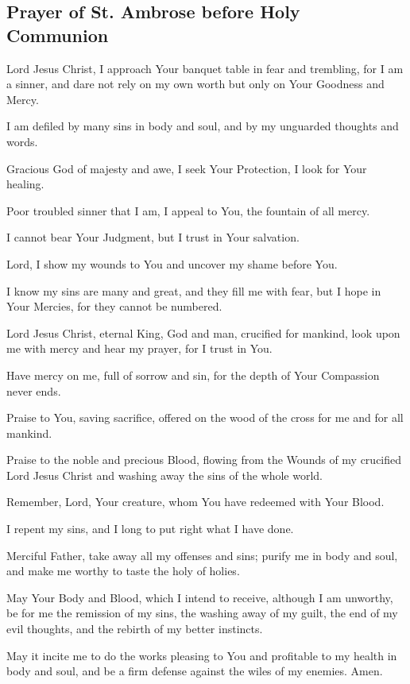 \documentclass[12pt]{article}
\newcommand{\prayertitle}[1]{\subsection{#1}}
\begin{document}
\prayertitle{Prayer of St. Ambrose before Holy Communion}
Lord Jesus Christ, I approach Your banquet table in fear and trembling, for I am a sinner, and dare not rely on my own worth but only on Your Goodness and Mercy.

I am defiled by many sins in body and soul, and by my unguarded thoughts and words.

Gracious God of majesty and awe, I seek Your Protection, I look for Your healing.

Poor troubled sinner that I am, I appeal to You, the fountain of all mercy.

I cannot bear Your Judgment, but I trust in Your salvation.

Lord, I show my wounds to You and uncover my shame before You.

I know my sins are many and great, and they fill me with fear, but I hope in Your Mercies, for they cannot be numbered.

Lord Jesus Christ, eternal King, God and man, crucified for mankind, look upon me with mercy and hear my prayer, for I trust in You.

Have mercy on me, full of sorrow and sin, for the depth of Your Compassion never ends.

Praise to You, saving sacrifice, offered on the wood of the cross for me and for all mankind.

Praise to the noble and precious Blood, flowing from the Wounds of my crucified Lord Jesus Christ and washing away the sins of the whole world.

Remember, Lord, Your creature, whom You have redeemed with Your Blood.

I repent my sins, and I long to put right what I have done.

Merciful Father, take away all my offenses and sins;
purify me in body and soul, and make me worthy to taste the holy of holies.

May Your Body and Blood, which I intend to receive, although I am unworthy, be for me the remission of my sins, the washing away of my guilt, the end of my evil thoughts, and the rebirth of my better instincts.

May it incite me to do the works pleasing to You and profitable to my health in body and soul, and be a firm defense against the wiles of my enemies.
Amen.
\end{document}
